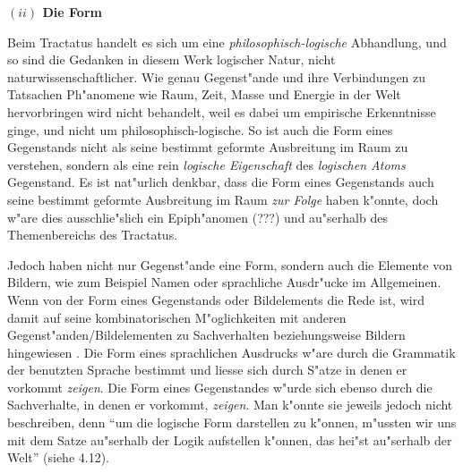 \documentclass[a4paper, emulatestandardclasses, 12pt]{scrartcl}
\begin{document}
\begin{onehalfspace}
\vspace{5mm}
\noindent\textbf{$(ii)$ Die Form}	

\noindent Beim Tractatus handelt es sich um eine \emph{philosophisch-logische} Abhandlung, und so sind die Gedanken in diesem Werk logischer Natur, nicht naturwissenschaftlicher. Wie genau Gegenst"ande und ihre Verbindungen zu Tatsachen Ph"anomene wie Raum, Zeit, Masse und Energie in der Welt hervorbringen wird nicht behandelt, weil es dabei um empirische Erkenntnisse ginge, und nicht um philosophisch-logische. So ist auch die Form eines Gegenstands nicht als seine bestimmt geformte Ausbreitung im Raum zu verstehen, sondern als eine rein \emph{logische Eigenschaft} des \emph{logischen Atoms} Gegenstand. Es ist nat"urlich denkbar, dass die Form eines Gegenstands auch seine bestimmt geformte Ausbreitung im Raum \emph{zur Folge} haben k"onnte, doch w"are dies ausschlie"slich ein Epiph"anomen (???) und au"serhalb des Themenbereichs des Tractatus. 

Jedoch haben nicht nur Gegenst"ande eine Form, sondern auch die Elemente von Bildern, wie zum Beispiel Namen oder sprachliche Ausdr"ucke im Allgemeinen. Wenn von der Form eines Gegenstands oder Bildelements die Rede ist, wird damit auf seine kombinatorischen M"oglichkeiten mit anderen Gegenst"anden/Bildelementen zu Sachverhalten beziehungsweise Bildern hingewiesen \cite[vgl.][S. 84]{emiliani1999formsp}. Die Form eines sprachlichen Ausdrucks w"are durch die Grammatik der benutzten Sprache bestimmt und liesse sich durch S"atze in denen er vorkommt \emph{zeigen}. Die Form eines Gegenstandes w"urde sich ebenso durch die Sachverhalte, in denen er vorkommt, \emph{zeigen}. Man k"onnte sie jeweils jedoch nicht beschreiben, denn "`um die logische Form darstellen zu k"onnen, m"ussten wir uns mit dem Satze au"serhalb der Logik aufstellen k"onnen, das hei"st au"serhalb der Welt"' (siehe 4.12). 





\end{onehalfspace}
\end{document}
